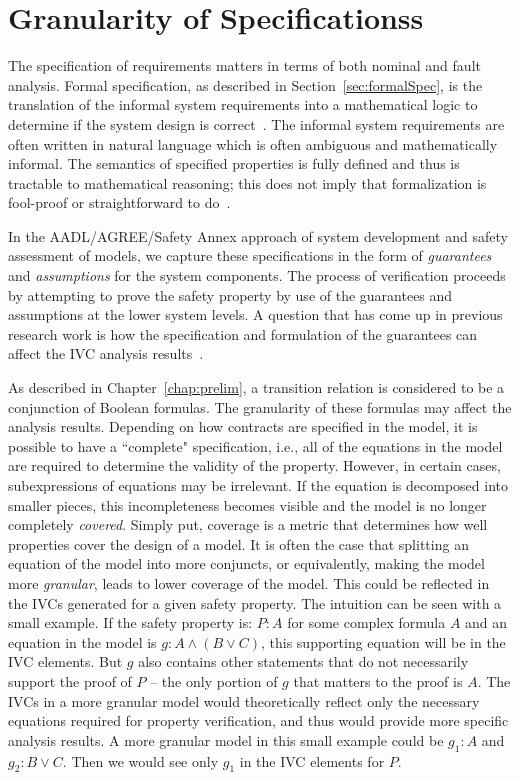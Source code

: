 \chapter{Granularity of Specificationss}
\label{chap:granularity}
The specification of requirements matters in terms of both nominal and fault analysis. Formal specification, as described in Section~\ref{sec:formalSpec}, is the translation of the informal system requirements into a mathematical logic to determine if the system design is correct~\cite{hinchey2012industrial}. The informal system requirements are often written in natural language which is often ambiguous and mathematically informal. The semantics of specified properties is fully defined and thus is tractable to mathematical reasoning; this does not imply that formalization is fool-proof or straightforward to do~\cite{kotonya1998requirements}. 

 In the AADL/AGREE/Safety Annex approach of system development and safety assessment of models, we capture these specifications in the form of \emph{guarantees} and \emph{assumptions} for the system components. The process of verification proceeds by attempting to prove the safety property by use of the guarantees and assumptions at the lower system levels. A question that has come up in previous research work is how the specification and formulation of the guarantees can affect the IVC analysis results~\cite{ghassabani_2018}. 

As described in Chapter~\ref{chap:prelim}, a transition relation is considered to be a conjunction of Boolean formulas. The granularity of these formulas may affect the analysis results. Depending on how contracts are specified in the model, it is possible to have a ``complete" specification, i.e., all of the equations in the model are required to determine the validity of the property. However, in certain cases, subexpressions of equations may be irrelevant. If the equation is decomposed into smaller pieces, this incompleteness becomes visible and the model is no longer completely {\em covered}. Simply put, coverage is a metric that determines how well properties cover the design of a model. It is often the case that splitting an equation of the model into more conjuncts, or equivalently, making the model more \textit{granular}, leads to lower coverage of the model. This could be reflected in the IVCs generated for a given safety property. The intuition can be seen with a small example. If the safety property is: $P : A $ for some complex formula $A$ and an equation in the model is $g: A \land (B \lor C)$, this supporting equation will be in the IVC elements. But $g$ also contains other statements that do not necessarily support the proof of $P$ -- the only portion of $g$ that matters to the proof is $A$. The IVCs in a more granular model would theoretically reflect only the necessary equations required for property verification, and thus would provide more specific analysis results. A more granular model in this small example could be $g_1 : A$ and $g_2: B \lor C$. Then we would see only $g_1$ in the IVC elements for $P$. 

